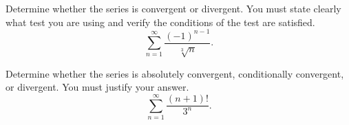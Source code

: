\begin{problem}
Determine whether the series is convergent or divergent. You must state
clearly what test you are using and verify the conditions of the test are
satisfied.
\[
\sum_{n=1}^\infty \frac{(-1)^{n-1}}{\sqrt[3]{n}}.
\]
\end{problem}
\bigskip
\begin{problem}
Determine whether the series is absolutely convergent, conditionally
convergent, or divergent. You must justify your answer.
\[
\sum_{n=1}^\infty\frac{(n+1)!}{3^n}.
\]
\end{problem}

